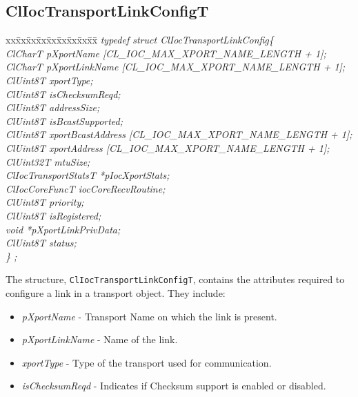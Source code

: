 \begin{flushleft}
\subsection{ClIocTransportLinkConfigT}
\begin{tabbing}
 xx\=xx\=xx\=xx\=xx\=xx\=xx\=xx\=xx\=\kill
 \textit{typedef struct ClIocTransportLinkConfig\{}\\
 \>\>\>\>\textit{ClCharT pXportName \mbox{[}CL\_IOC\_MAX\_XPORT\_NAME\_LENGTH + 1\mbox{]};}\\
 \>\>\>\>\textit{ClCharT pXportLinkName \mbox{[}CL\_IOC\_MAX\_XPORT\_NAME\_LENGTH + 1\mbox{]};}\\
 \>\>\>\>\textit{ClUint8T xportType;}\\
 \>\>\>\>\textit{ClUint8T isChecksumReqd;}\\
 \>\>\>\>\textit{ClUint8T addressSize;}\\
 \>\>\>\>\textit{ClUint8T isBcastSupported;}\\
 \>\>\>\>\textit{ClUint8T xportBcastAddress \mbox{[}CL\_IOC\_MAX\_XPORT\_NAME\_LENGTH + 1\mbox{]};}\\
\>\>\>\>\textit{ClUint8T xportAddress \mbox{[}CL\_IOC\_MAX\_XPORT\_NAME\_LENGTH + 1\mbox{]};}\\
 \>\>\>\>\textit{ClUint32T mtuSize;}\\
 \>\>\>\>\textit{ClIocTransportStatsT *pIocXportStats;}\\
 \>\>\>\>\textit{ClIocCoreFuncT iocCoreRecvRoutine;}\\
 \>\>\>\>\textit{ClUint8T priority;}\\
 \>\>\>\>\textit{ClUint8T isRegistered;}\\
 \>\>\>\>\textit{void *pXportLinkPrivData;}\\
 \>\>\>\>\textit{ClUint8T status;}\\
 \textit{\} ;}\end{tabbing}
 The structure, {\tt{ClIocTransportLinkConfigT}}, contains the attributes required to configure a link in a transport object. They include:
 \begin{itemize}
 \item
\textit{pXportName} - Transport Name on which the link is present.
\item
\textit{pXportLinkName} - Name of the link.
\item
\textit{xportType} - Type of the transport used for communication. 
\item
\textit{isChecksumReqd} - Indicates if Checksum support is enabled or disabled.

\end{itemize}
\end{flushleft}
